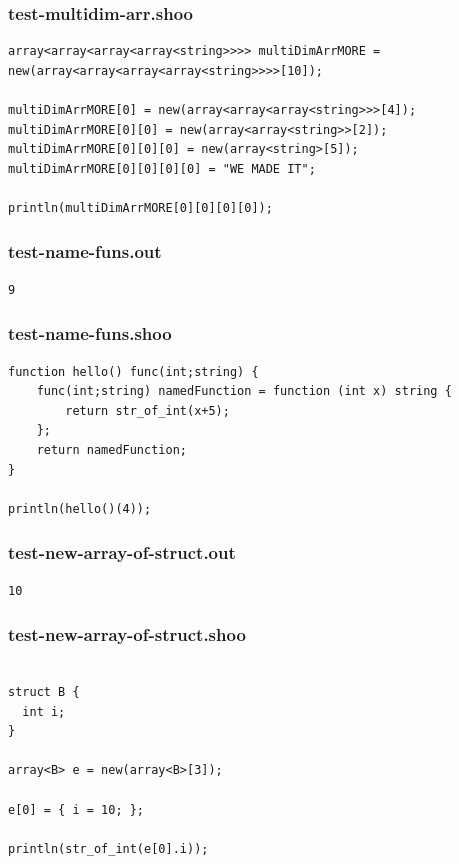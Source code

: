 \documentclass[12pt]{article}
\begin{document}
\subsubsection{test-multidim-arr.shoo}
\begin{mdframed}[hidealllines=true,backgroundcolor=blue!10]
\begin{lstlisting}
array<array<array<array<string>>>> multiDimArrMORE = new(array<array<array<array<string>>>>[10]);

multiDimArrMORE[0] = new(array<array<array<string>>>[4]);
multiDimArrMORE[0][0] = new(array<array<string>>[2]);
multiDimArrMORE[0][0][0] = new(array<string>[5]);
multiDimArrMORE[0][0][0][0] = "WE MADE IT";

println(multiDimArrMORE[0][0][0][0]);\end{lstlisting}
\end{mdframed}
\subsubsection{test-name-funs.out}
\begin{mdframed}[hidealllines=true,backgroundcolor=green!10]
\begin{lstlisting}
9
\end{lstlisting}
\end{mdframed}
\subsubsection{test-name-funs.shoo}
\begin{mdframed}[hidealllines=true,backgroundcolor=blue!10]
\begin{lstlisting}
function hello() func(int;string) {
	func(int;string) namedFunction = function (int x) string {
		return str_of_int(x+5);
	};
	return namedFunction;
}

println(hello()(4));\end{lstlisting}
\end{mdframed}
\subsubsection{test-new-array-of-struct.out}
\begin{mdframed}[hidealllines=true,backgroundcolor=green!10]
\begin{lstlisting}
10
\end{lstlisting}
\end{mdframed}
\subsubsection{test-new-array-of-struct.shoo}
\begin{mdframed}[hidealllines=true,backgroundcolor=blue!10]
\begin{lstlisting}

struct B {
  int i;
}

array<B> e = new(array<B>[3]);

e[0] = { i = 10; };

println(str_of_int(e[0].i));
\end{lstlisting}
\end{mdframed}
\end{document}
